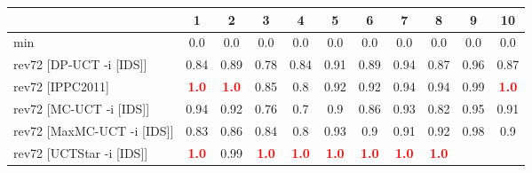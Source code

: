 \documentclass{article}
\begin{document}
\begin{tabular}{|l|r@{$\pm$}rr@{$\pm$}rr@{$\pm$}rr@{$\pm$}rr@{$\pm$}rr@{$\pm$}rr@{$\pm$}rr@{$\pm$}rr@{$\pm$}rr@{$\pm$}r|}
\hline

& \multicolumn{2}{c}{1}
& \multicolumn{2}{c}{2}
& \multicolumn{2}{c}{3}
& \multicolumn{2}{c}{4}
& \multicolumn{2}{c}{5}
& \multicolumn{2}{c}{6}
& \multicolumn{2}{c}{7}
& \multicolumn{2}{c}{8}
& \multicolumn{2}{c}{9}
& \multicolumn{2}{c|}{10}
\\
\hline
\hline
min
& \multicolumn{2}{c}{0.0}
& \multicolumn{2}{c}{0.0}
& \multicolumn{2}{c}{0.0}
& \multicolumn{2}{c}{0.0}
& \multicolumn{2}{c}{0.0}
& \multicolumn{2}{c}{0.0}
& \multicolumn{2}{c}{0.0}
& \multicolumn{2}{c}{0.0}
& \multicolumn{2}{c}{0.0}
& \multicolumn{2}{c|}{0.0}
\\
rev72 [DP-UCT -i [IDS]]
& \multicolumn{2}{c}{0.84}
& \multicolumn{2}{c}{0.89}
& \multicolumn{2}{c}{0.78}
& \multicolumn{2}{c}{0.84}
& \multicolumn{2}{c}{0.91}
& \multicolumn{2}{c}{0.89}
& \multicolumn{2}{c}{0.94}
& \multicolumn{2}{c}{0.87}
& \multicolumn{2}{c}{0.96}
& \multicolumn{2}{c|}{0.87}
\\
rev72 [IPPC2011]
& \multicolumn{2}{c}{\textbf{\textcolor{red}{1.0}}}
& \multicolumn{2}{c}{\textbf{\textcolor{red}{1.0}}}
& \multicolumn{2}{c}{0.85}
& \multicolumn{2}{c}{0.8}
& \multicolumn{2}{c}{0.92}
& \multicolumn{2}{c}{0.92}
& \multicolumn{2}{c}{0.94}
& \multicolumn{2}{c}{0.94}
& \multicolumn{2}{c}{0.99}
& \multicolumn{2}{c|}{\textbf{\textcolor{red}{1.0}}}
\\
rev72 [MC-UCT -i [IDS]]
& \multicolumn{2}{c}{0.94}
& \multicolumn{2}{c}{0.92}
& \multicolumn{2}{c}{0.76}
& \multicolumn{2}{c}{0.7}
& \multicolumn{2}{c}{0.9}
& \multicolumn{2}{c}{0.86}
& \multicolumn{2}{c}{0.93}
& \multicolumn{2}{c}{0.82}
& \multicolumn{2}{c}{0.95}
& \multicolumn{2}{c|}{0.91}
\\
rev72 [MaxMC-UCT -i [IDS]]
& \multicolumn{2}{c}{0.83}
& \multicolumn{2}{c}{0.86}
& \multicolumn{2}{c}{0.84}
& \multicolumn{2}{c}{0.8}
& \multicolumn{2}{c}{0.93}
& \multicolumn{2}{c}{0.9}
& \multicolumn{2}{c}{0.91}
& \multicolumn{2}{c}{0.92}
& \multicolumn{2}{c}{0.98}
& \multicolumn{2}{c|}{0.9}
\\
rev72 [UCTStar -i [IDS]]
& \multicolumn{2}{c}{\textbf{\textcolor{red}{1.0}}}
& \multicolumn{2}{c}{0.99}
& \multicolumn{2}{c}{\textbf{\textcolor{red}{1.0}}}
& \multicolumn{2}{c}{\textbf{\textcolor{red}{1.0}}}
& \multicolumn{2}{c}{\textbf{\textcolor{red}{1.0}}}
& \multicolumn{2}{c}{\textbf{\textcolor{red}{1.0}}}
& \multicolumn{2}{c}{\textbf{\textcolor{red}{1.0}}}
& \multicolumn{2}{c}{\textbf{\textcolor{red}{1.0}}}

\end{tabular}
\end{document}
